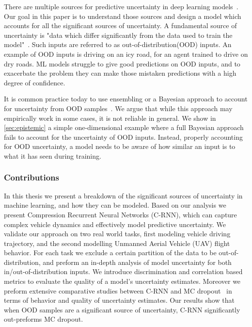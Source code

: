 \documentclass[../main.tex]{subfiles}
\begin{document}
There are multiple sources for predictive uncertainty in deep learning models~\citep{kendall2017uncertainties}. Our goal in this paper is to understand those sources and design a model which accounts for all the significant sources of uncertainty. A fundamental source of uncertainty is "data which differ significantly from the data used to train the model"~\citep{bishop1994novelty}. Such inputs are referred to as out-of-distribution(OOD) inputs. An example of OOD inputs is driving on an icy road, for an agent trained to drive on dry roads. ML models struggle to give good predictions on OOD inputs, and to exacerbate the problem they can make those mistaken predictions with a high degree of confidence. 

It is common practice today to use ensembling or a Bayesian approach to account for uncertainty from OOD samples~\citep{kendall2017uncertainties, zhu2017deep, lakshminarayanan2017simple}. We argue that while this approach may empirically work in some cases, it is not reliable in general. We show in \cref{sec:epistemic} a simple one-dimensional example where a full Bayesian approach fails to account for the uncertainty of OOD inputs. Instead, properly accounting for OOD uncertainty, a model needs to be aware of how similar an input is to what it has seen during training.

\subsubsection{Contributions}

In this thesis we present a breakdown of the significant sources of uncertainty in machine learning, and how they can be modeled. Based on our analysis we present Compression Recurrent Neural Networks (C-RNN), which can capture complex vehicle dynamics and effectively model predictive uncertainty. We validate our approach on two real world tasks, first modeling vehicle driving trajectory, and the second modelling Unmanned Aerial Vehicle (UAV) flight behavior. For each task we exclude a certain partition of the data to be out-of-distribution, and preform an in-depth analysis of model uncertainty for both in/out-of-distribution inputs. We introduce discrimination and correlation based metrics to evaluate the quality of a model's uncertainty estimates. Moreover we preform extensive comparative studies between C-RNN and MC dropout~\citep{gal2016dropout} in terms of behavior and quality of uncertainty estimates. Our results show that when OOD samples are a significant source of uncertainty, C-RNN significantly out-preforms MC dropout.  
\end{document}
